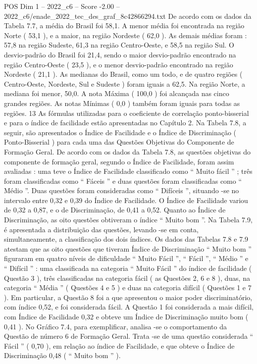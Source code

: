 \begin{textsample}{POS Dim 1 – 2022\_c6 – Score -2.00 – 2022\_c6/enade\_2022\_tec\_des\_graf\_8c42866294.txt}
De acordo com os dados da Tabela 7.7, a média do Brasil foi 58,1.
A menor média foi encontrada na região Norte ( 53,1 ), e a maior, na região Nordeste ( 62,0 ).
As demais médias foram : 57,8 na região Sudeste, 61,3 na região Centro-Oeste, e 58,5 na região Sul.
O desvio-padrão do Brasil foi 21,4, sendo o maior desvio-padrão encontrado na região Centro-Oeste ( 23,5 ), e o menor desvio-padrão encontrado na região Nordeste ( 21,1 ).
As medianas do Brasil, como um todo, e de quatro regiões ( Centro-Oeste, Nordeste, Sul e Sudeste ) foram iguais a 62,5.
Na região Norte, a mediana foi menor, 50,0.
A nota Máxima ( 100,0 ) foi alcançada nas cinco grandes regiões.
As notas Mínimas ( 0,0 ) também foram iguais para todas as regiões. 13 As fórmulas utilizadas para o coeficiente de correlação ponto-bisserial e para o índice de facilidade estão apresentadas no Capítulo 2.
Na Tabela 7.8, a seguir, são apresentados o Índice de Facilidade e o Índice de Discriminação ( Ponto-Bisserial ) para cada uma das Questões Objetivas do Componente de Formação Geral.
De acordo com os dados da Tabela 7.8, as questões objetivas do componente de formação geral, segundo o Índice de Facilidade, foram assim avaliadas : uma teve o Índice de Facilidade classificado como “ Muito fácil ” ; três foram classificadas como “ Fáceis ” e duas questões foram classificadas como “ Médio ”.
Duas questões foram consideradas como “ Difíceis ”, situando -se no intervalo entre 0,32 e 0,39 do Índice de Facilidade.
O Índice de Facilidade variou de 0,32 a 0,87, e o de Discriminação, de 0,41 a 0,52.
Quanto ao Índice de Discriminação, as oito questões obtiveram o índice “ Muito bom ”.
Na Tabela 7.9, é apresentada a distribuição das questões, levando -se em conta, simultaneamente, a classificação dos dois índices.
Os dados das Tabelas 7.8 e 7.9 atestam que as oito questões que tiveram Índice de Discriminação “ Muito bom ” figuraram em quatro níveis de dificuldade “ Muito Fácil ”, “ Fácil ”, “ Médio ” e “ Difícil ” : uma classificada na categoria “ Muito Fácil ” do índice de facilidade ( Questão 3 ), três classificadas na categoria fácil ( as Questões 2, 6 e 8 ), duas, na categoria “ Média ” ( Questões 4 e 5 ) e duas na categoria difícil ( Questões 1 e 7 ).
Em particular, a Questão 8 foi a que apresentou o maior poder discriminatório, com índice 0,52, e foi considerada fácil.
A Questão 1 foi considerada a mais difícil, com Índice de Facilidade 0,32 e obteve um Índice de Discriminação muito bom ( 0,41 ).
No Gráfico 7.4, para exemplificar, analisa -se o comportamento da Questão de número 6 de Formação Geral.
Trata -se de uma questão considerada “ Fácil ” ( 0,70 ), em relação ao índice de Facilidade, e que obteve o Índice de Discriminação 0,48 ( “ Muito bom ” ).

\end{textsample}

